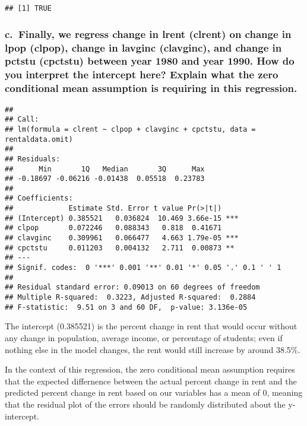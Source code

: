 \documentclass[
]{article}
\begin{document}
\begin{verbatim}
## [1] TRUE
\end{verbatim}

\hypertarget{c.-finally-we-regress-change-in-lrent-clrent-on-change-in-lpop-clpop-change-in-lavginc-clavginc-and-change-in-pctstu-cpctstu-between-year-1980-and-year-1990.-how-do-you-interpret-the-intercept-here-explain-what-the-zero-conditional-mean-assumption-is-requiring-in-this-regression.}{%
\subsubsection{c.~Finally, we regress change in lrent (clrent) on change
in lpop (clpop), change in lavginc (clavginc), and change in pctstu
(cpctstu) between year 1980 and year 1990. How do you interpret the
intercept here? Explain what the zero conditional mean assumption is
requiring in this
regression.}\label{c.-finally-we-regress-change-in-lrent-clrent-on-change-in-lpop-clpop-change-in-lavginc-clavginc-and-change-in-pctstu-cpctstu-between-year-1980-and-year-1990.-how-do-you-interpret-the-intercept-here-explain-what-the-zero-conditional-mean-assumption-is-requiring-in-this-regression.}}

\begin{verbatim}
## 
## Call:
## lm(formula = clrent ~ clpop + clavginc + cpctstu, data = rentaldata.omit)
## 
## Residuals:
##      Min       1Q   Median       3Q      Max 
## -0.18697 -0.06216 -0.01438  0.05518  0.23783 
## 
## Coefficients:
##             Estimate Std. Error t value Pr(>|t|)    
## (Intercept) 0.385521   0.036824  10.469 3.66e-15 ***
## clpop       0.072246   0.088343   0.818  0.41671    
## clavginc    0.309961   0.066477   4.663 1.79e-05 ***
## cpctstu     0.011203   0.004132   2.711  0.00873 ** 
## ---
## Signif. codes:  0 '***' 0.001 '**' 0.01 '*' 0.05 '.' 0.1 ' ' 1
## 
## Residual standard error: 0.09013 on 60 degrees of freedom
## Multiple R-squared:  0.3223, Adjusted R-squared:  0.2884 
## F-statistic:  9.51 on 3 and 60 DF,  p-value: 3.136e-05
\end{verbatim}

The intercept (0.385521) is the percent change in rent that would occur
without any change in population, average income, or percentage of
students; even if nothing else in the model changes, the rent would
still increase by around 38.5\%.

In the context of this regression, the zero conditional mean assumption
requires that the expected differnence between the actual percent change
in rent and the predicted percent change in rent based on our variables
has a mean of 0, meaning that the residual plot of the errors should be
randomly distributed about the y-intercept.
\end{document}
